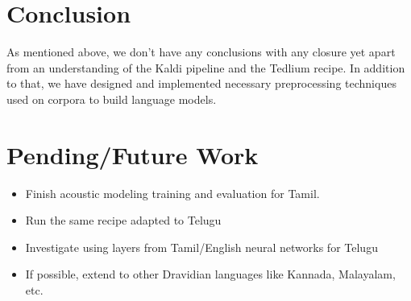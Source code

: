 \documentclass[11pt]{article} \usepackage{spconf,amsmath,graphicx}
\begin{document}
\section{Conclusion}
As mentioned above, we don't have any conclusions with any closure yet  apart from an understanding of the Kaldi pipeline and the Tedlium recipe.
In addition to that, we have designed and implemented necessary preprocessing techniques used on corpora to build language models.

\section{Pending/Future Work}
\begin{itemize}
	\item Finish acoustic modeling training and evaluation for Tamil.
	\item Run the same recipe adapted to Telugu
	\item Investigate using layers from Tamil/English neural networks for Telugu
	\item If possible, extend to other Dravidian languages like Kannada, Malayalam, etc.
\end{itemize}

 
\end{document}
